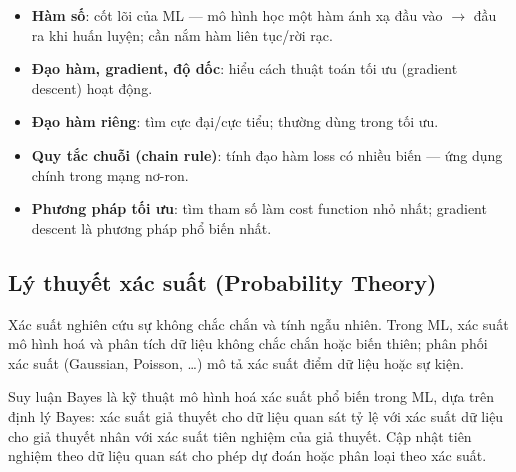 \begin{phuongphap}[title={Các khái niệm giải tích quan trọng trong ML}]
\begin{itemize}
  \item \textbf{Hàm số}: cốt lõi của ML --- mô hình học một hàm ánh xạ đầu vào $\rightarrow$ đầu ra khi huấn luyện; cần nắm hàm liên tục/rời rạc.
  \item \textbf{Đạo hàm, gradient, độ dốc}: hiểu cách thuật toán tối ưu (gradient descent) hoạt động.
  \item \textbf{Đạo hàm riêng}: tìm cực đại/cực tiểu; thường dùng trong tối ưu.
  \item \textbf{Quy tắc chuỗi (chain rule)}: tính đạo hàm loss có nhiều biến --- ứng dụng chính trong mạng nơ-ron.
  \item \textbf{Phương pháp tối ưu}: tìm tham số làm cost function nhỏ nhất; gradient descent là phương pháp phổ biến nhất.
\end{itemize}
\end{phuongphap}

\subsection{Lý thuyết xác suất (Probability Theory)}

\begin{dinhnghia}[title={Xác suất}]
Xác suất nghiên cứu sự không chắc chắn và tính ngẫu nhiên.
Trong ML, xác suất mô hình hoá và phân tích dữ liệu không chắc chắn hoặc biến thiên; phân phối xác suất (Gaussian, Poisson, \ldots) mô tả xác suất điểm dữ liệu hoặc sự kiện.
\end{dinhnghia}

\begin{ynghia}[title={Suy luận Bayes}]
Suy luận Bayes là kỹ thuật mô hình hoá xác suất phổ biến trong ML, dựa trên định lý Bayes:
xác suất giả thuyết cho dữ liệu quan sát tỷ lệ với xác suất dữ liệu cho giả thuyết nhân với xác suất tiên nghiệm của giả thuyết.
Cập nhật tiên nghiệm theo dữ liệu quan sát cho phép dự đoán hoặc phân loại theo xác suất.
\end{ynghia}

